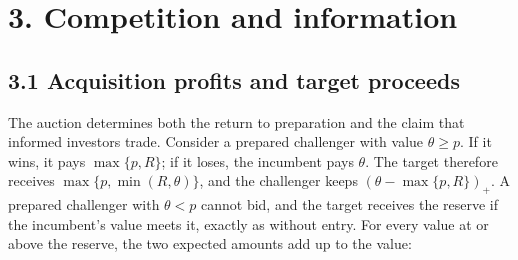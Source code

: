 
\section{3. Competition and information}\label{sec-payoffs}

\subsection{3.1 Acquisition profits and target
proceeds}\label{sec-acquisition-profits-and-target-proceeds}

The auction determines both the return to preparation and the claim that
informed investors trade. Consider a prepared challenger with value
\(\theta\ge p\). If it wins, it pays \(\max\{p,R\}\); if it loses, the
incumbent pays \(\theta\). The target therefore receives
\(\max\{p,\min(R,\theta)\}\), and the challenger keeps
\((\theta-\max\{p,R\})_+\). A prepared challenger with \(\theta<p\)
cannot bid, and the target receives the reserve if the incumbent's value
meets it, exactly as without entry. For every value at or above the
reserve, the two expected amounts add up to the value:

